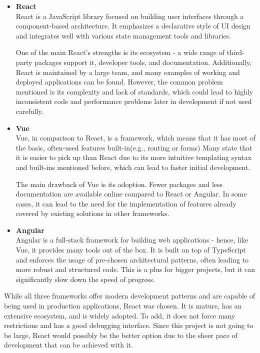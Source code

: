 \begin{itemize}
    \item \textbf{React} \\
    React is a JavaScript library focused on building user interfaces through a component-based architecture.\cite{react}
    It emphasizes a declarative style of UI design and integrates well with various state management tools and libraries.

    One of the main React’s strengths is its ecosystem - a wide range of third-party packages support it,
    developer tools, and documentation.
    Additionally, React is maintained by a large team, and many examples of working and deployed applications can be found.
    However, the common problem mentioned is its complexity and lack of standards, which could lead to highly inconsistent
    code and performance problems later in development if not used carefully.

    \item \textbf{Vue} \\
    Vue, in comparison to React, is a framework, which means that it has most of the basic, often-used features built-in(e.g., routing or forms)\cite{vue}
    Many state that it is easier to pick up than React due to its more intuitive templating syntax and built-ins mentioned before,
    which can lead to faster initial development.

    The main drawback of Vue is its adoption.\cite{frameworkdata}
    Fewer packages and less documentation are available online compared to React or Angular.
    In some cases, it can lead to the need for the implementation of features already covered by existing solutions in other frameworks.

    \item \textbf{Angular} \\
    Angular is a full-stack framework for building web applications - hence, like Vue, it provides many tools out of the box.
    It is built on top of TypeScript and enforces the usage of pre-chosen architectural patterns, often leading to
    more robust and structured code. This is a plus for bigger projects, but it can significantly slow down the speed of
    progress.

\end{itemize}

While all three frameworks offer modern development patterns and are capable of being used in production applications,
React was chosen. It is mature, has an extensive ecosystem, and is widely adopted. To add, it does not force many
restrictions and has a good debugging interface. Since this project is not going to be large, React would possibly be the
better option due to the sheer pace of development that can be achieved with it.

